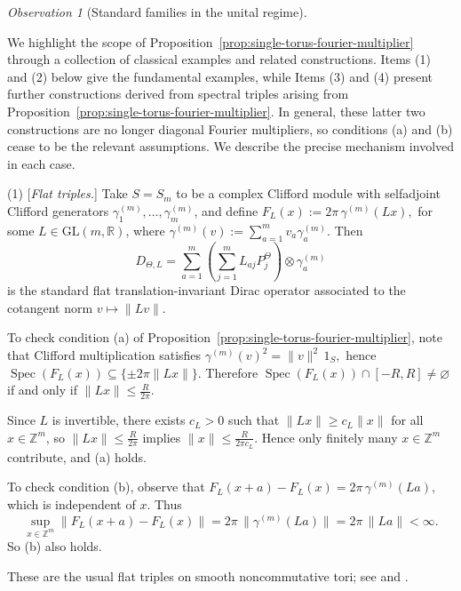 \documentclass[11pt]{amsart}
\theoremstyle{definition}
\theoremstyle{remark}
\newtheorem{observation}[theorem]{Observation}
\newcommand{\Z}{\mathbb{Z}}
\newcommand{\R}{\mathbb{R}}
\newcommand{\GL}{\mathrm{GL}}
\begin{document}
\begin{observation}[Standard families in the unital regime]
\label{rem:unital-special-spectral-triples}

We highlight the scope of Proposition~\ref{prop:single-torus-fourier-multiplier} through a collection of classical examples and related constructions. Items \textup{(1)} and \textup{(2)} below give the fundamental examples, while Items \textup{(3)} and \textup{(4)} present further constructions derived from spectral triples arising from Proposition~\ref{prop:single-torus-fourier-multiplier}. In general, these latter two constructions are no longer diagonal Fourier multipliers, so conditions \textup{(a)} and \textup{(b)} cease to be the relevant assumptions. We describe the precise mechanism involved in each case.

\smallskip

\noindent
 
 (1) [\emph{Flat triples.}] Take $S=S_m$ to be a complex Clifford module with selfadjoint Clifford
generators $\gamma_1^{(m)},\ldots,\gamma_m^{(m)}$, and define $F_L(x):=2\pi\,\gamma^{(m)}(Lx),$ for some $L\in \GL(m,\R)$,
where $\gamma^{(m)}(v):=\sum_{a=1}^m v_a\gamma_a^{(m)}.$
Then
\[
D_{\Theta,L}
=\sum_{a=1}^m
\left(\sum_{j=1}^m L_{aj}P_j^\Theta\right)\otimes \gamma_a^{(m)}
\]
is the standard flat translation-invariant Dirac operator associated to the cotangent norm
$v\mapsto \|Lv\|$.

To check condition \textup{(a)} of Proposition~\ref{prop:single-torus-fourier-multiplier}, note that Clifford multiplication satisfies
$\gamma^{(m)}(v)^2=\|v\|^2\,1_S,$
hence $\operatorname{Spec}(F_L(x))\subseteq \{\pm 2\pi\|Lx\|\}.$
Therefore $\operatorname{Spec}(F_L(x))\cap[-R,R]\neq\varnothing$ if and only if
$\|Lx\|\leq \frac{R}{2\pi}.$

Since $L$ is invertible, there exists $c_L>0$ such that $\|Lx\|\geq c_L\|x\|$ for all
$x\in\Z^m$,
so $\|Lx\|\leq \frac{R}{2\pi}$ implies $\|x\|\leq \frac{R}{2\pi c_L}.$
Hence only finitely many $x\in\Z^m$ contribute, and \textup{(a)} holds.

To check condition \textup{(b)}, observe that $F_L(x+a)-F_L(x)=2\pi\,\gamma^{(m)}(La),$
which is independent of $x$. Thus
\[
\sup_{x\in\Z^m}\|F_L(x+a)-F_L(x)\|
=
2\pi\,\|\gamma^{(m)}(La)\|
=
2\pi\,\|La\|
<
\infty.
\]
So \textup{(b)} also holds.

These are the usual flat triples on smooth noncommutative tori; see
\cite[Section~2]{CDV1} and \cite[Section~3]{CDV2}.

\smallskip


\end{observation}
\end{document}
